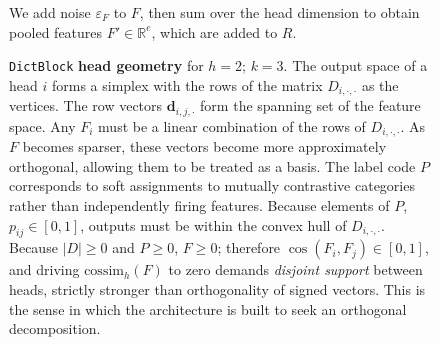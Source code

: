 \begin{figure}[tp]
{	We add noise $\varepsilon_F$ to $F$, then sum over the head dimension to obtain
	pooled features $F' \in \mathbb{R}^{e}$, which are added to $R$.
}
\label{fig:dictenc}
\end{figure}

\begin{figure}[tp]
\centering

\caption[Per-head geometry]{\texttt{DictBlock} \textbf{head geometry} for $h=2$; $k=3$.
	The output space of a head $i$ forms a simplex with the rows of the matrix
	$D_{i,\cdot,\cdot}$ as the vertices.
	The row vectors $\mathbf{d}_{i,j,\cdot}$ form the spanning set of the
	feature space. Any $F_i$ must be a linear combination of the rows of
	$D_{i,\cdot,\cdot}$.
	As $F$ becomes sparser, these vectors become more approximately
	orthogonal, allowing them to be treated as a basis.
	The label code $P$ corresponds to soft assignments to mutually
	contrastive categories rather than independently firing features.
	Because elements of $P$, $p_{ij} \in [0,1]$,
	outputs must be within the convex hull of $D_{i,\cdot,\cdot}$.
	Because $\lvert D\rvert\geq0$ and $P\geq0$, $F\geq0$;
	therefore $\cos(F_i, F_j) \in [0,1]$, and driving
	$\mathrm{cossim}_h(F)$ to zero demands \emph{disjoint support}
	between heads, strictly stronger than orthogonality of signed
	vectors. This is the sense in which the architecture is built to
	seek an orthogonal decomposition.}
\label{fig:head-simplex}
\end{figure}

